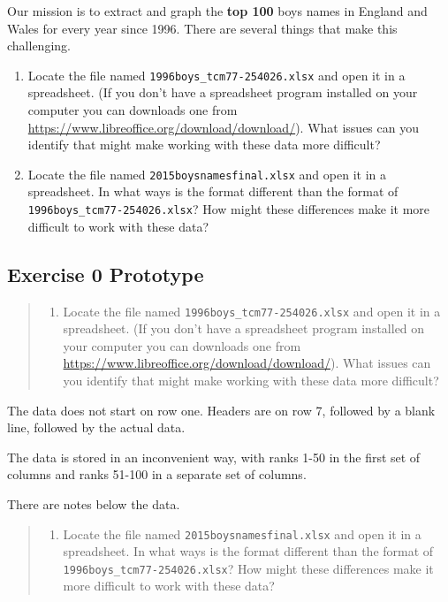\documentclass[]{book}
\providecommand{\tightlist}{%
  \setlength{\itemsep}{0pt}\setlength{\parskip}{0pt}}
\begin{document}
Our mission is to extract and graph the \textbf{top 100} boys names in
England and Wales for every year since 1996. There are several things
that make this challenging.

\begin{enumerate}
\def\labelenumi{\arabic{enumi}.}
\item
  Locate the file named \texttt{1996boys\_tcm77-254026.xlsx} and open it
  in a spreadsheet. (If you don't have a spreadsheet program installed
  on your computer you can downloads one from
  \url{https://www.libreoffice.org/download/download/}). What issues can
  you identify that might make working with these data more difficult?
\item
  Locate the file named \texttt{2015boysnamesfinal.xlsx} and open it in
  a spreadsheet. In what ways is the format different than the format of
  \texttt{1996boys\_tcm77-254026.xlsx}? How might these differences make
  it more difficult to work with these data?
\end{enumerate}

\subsection{Exercise 0 Prototype}\label{exercise-0-prototype-1}

\begin{quote}
\begin{enumerate}
\def\labelenumi{\arabic{enumi}.}
\tightlist
\item
  Locate the file named \texttt{1996boys\_tcm77-254026.xlsx} and open it
  in a spreadsheet. (If you don't have a spreadsheet program installed
  on your computer you can downloads one from
  \url{https://www.libreoffice.org/download/download/}). What issues can
  you identify that might make working with these data more difficult?
\end{enumerate}
\end{quote}

The data does not start on row one. Headers are on row 7, followed by a
blank line, followed by the actual data.

The data is stored in an inconvenient way, with ranks 1-50 in the first
set of columns and ranks 51-100 in a separate set of columns.

There are notes below the data.

\begin{quote}
\begin{enumerate}
\def\labelenumi{\arabic{enumi}.}
\setcounter{enumi}{2}
\tightlist
\item
  Locate the file named \texttt{2015boysnamesfinal.xlsx} and open it in
  a spreadsheet. In what ways is the format different than the format of
  \texttt{1996boys\_tcm77-254026.xlsx}? How might these differences make
  it more difficult to work with these data?
\end{enumerate}
\end{quote}
\end{document}
